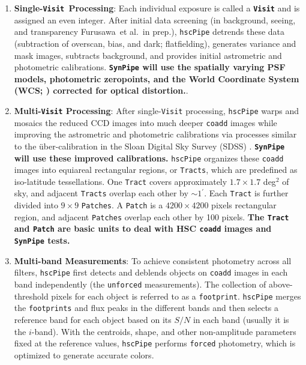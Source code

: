 \documentclass[useamsfonts]{pasj01}
\def\amin{$^\prime$}
\def\etal{{\ et al.~}}
\def\hscpipe{\texttt{hscPipe}}
\def\synpipe{\texttt{SynPipe}}
\def\forced{\texttt{forced}}
\def\coadd{\texttt{coadd}}
\def\unforced{\texttt{unforced}}
\def\tract{\texttt{Tract}}
\def\visit{\texttt{Visit}}
\def\tracts{\texttt{Tracts}}
\newcommand{\term}[1]{\textbf{\texttt{#1}}}
\begin{document}
    \begin{enumerate}

        \item \textbf{Single-\texttt{Visit~}Processing}:
            Each individual exposure is called a \term{Visit} and is assigned 
            an even integer.
            After initial data screening (in background, seeing, and transparency
            Furusawa\etal in prep.), \hscpipe{} detrends these data (subtraction
            of overscan, bias, and dark; flatfielding), generates variance and mask
            images, subtracts background, and provides initial astrometric and
            photometric calibrations.
            \textbf{\synpipe{} will use the spatially varying PSF models, photometric 
            zeropoints, and the World Coordinate System (WCS; \citealt{WCS1, WCS2}) 
            corrected for optical distortion.}.

        \item \textbf{Multi-\visit{} Processing}:
            After single-\visit{} processing, \hscpipe{} warps and mosaics the 
            reduced CCD images into much deeper \coadd{} images while improving
            the astrometric and photometric calibrations via processes similar to 
            the \"{u}ber-calibration in the Sloan Digital Sky Survey (SDSS) 
            \citep{Padmanabhan2008}.
            \textbf{\synpipe{} will use these improved calibrations.}
            \hscpipe{} organizes these \coadd{} images into equiareal rectangular 
            regions, or \tracts{}, which are predefined as iso-latitude tessellations.
            One \tract{} covers approximately $1.7\times 1.7$ deg$^2$ of sky, and 
            adjacent \tracts{} overlap each other by ${\sim}1$\amin{}.
            Each \tract{} is further divided into $9\times9$ \texttt{Patches}.
            A \texttt{Patch} is a $4200\times4200$ pixels rectangular region, and
            adjacent \texttt{Patches} overlap each other by 100 pixels.
            \textbf{The \tract{} and \texttt{Patch} are basic units to deal
            with HSC \coadd{} images and \synpipe{} tests.}

        \item \textbf{Multi-band Measurements}:
            To achieve consistent photometry across all filters, \hscpipe{} first
            detects and deblends objects on \coadd{} images in each band
            independently (the \unforced{} measurements).
            The collection of above-threshold pixels for each object is referred to as
            a \texttt{footprint}.
            \hscpipe{} merges the \texttt{footprints} and flux peaks in the different
            bands and then selects a reference band for each object based on its $S/N$ 
            in each band (usually it is the $i$-band).
            With the centroids, shape, and other non-amplitude parameters fixed at the
            reference values, \hscpipe{} performs \forced{} photometry, which is
            optimized to generate accurate colors.


\end{enumerate}
\end{document}
